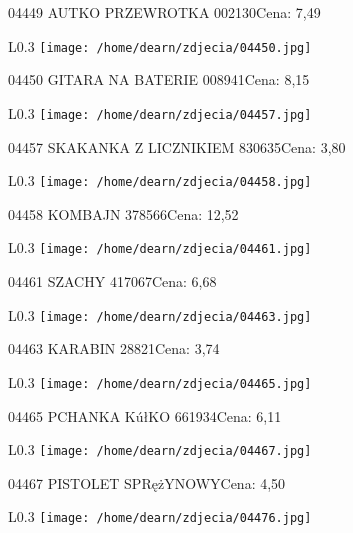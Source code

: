 04449 AUTKO PRZEWROTKA                                002130Cena: 7,49\newline
\begin{wrapfigure}{L}{0.3\textwidth}
\texttt{[image: /home/dearn/zdjecia/04450.jpg]}
\end{wrapfigure}
04450 GITARA NA BATERIE                               008941Cena: 8,15\newline
\begin{wrapfigure}{L}{0.3\textwidth}
\texttt{[image: /home/dearn/zdjecia/04457.jpg]}
\end{wrapfigure}
04457 SKAKANKA Z LICZNIKIEM                           830635Cena: 3,80\newline
\begin{wrapfigure}{L}{0.3\textwidth}
\texttt{[image: /home/dearn/zdjecia/04458.jpg]}
\end{wrapfigure}
04458 KOMBAJN                                         378566Cena: 12,52\newline
\begin{wrapfigure}{L}{0.3\textwidth}
\texttt{[image: /home/dearn/zdjecia/04461.jpg]}
\end{wrapfigure}
04461 SZACHY                                          417067Cena: 6,68\newline
\begin{wrapfigure}{L}{0.3\textwidth}
\texttt{[image: /home/dearn/zdjecia/04463.jpg]}
\end{wrapfigure}
04463 KARABIN                                         28821Cena: 3,74\newline
\begin{wrapfigure}{L}{0.3\textwidth}
\texttt{[image: /home/dearn/zdjecia/04465.jpg]}
\end{wrapfigure}
04465 PCHANKA KúłKO                                   661934Cena: 6,11\newline
\begin{wrapfigure}{L}{0.3\textwidth}
\texttt{[image: /home/dearn/zdjecia/04467.jpg]}
\end{wrapfigure}
04467 PISTOLET SPRężYNOWYCena: 4,50\newline
\begin{wrapfigure}{L}{0.3\textwidth}
\texttt{[image: /home/dearn/zdjecia/04476.jpg]}
\end{wrapfigure}
